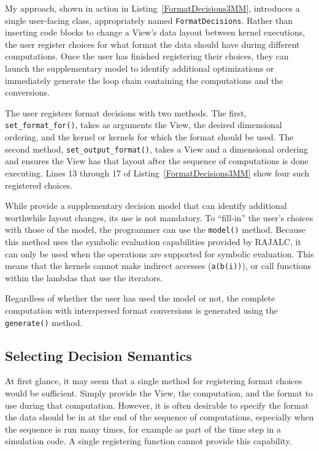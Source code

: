 My approach, shown in action in Listing~\ref{FormatDecisions3MM}, introduces a single user-facing class, appropriately named \verb.FormatDecisions..
Rather than inserting code blocks to change a View's data layout between kernel executions, the user register choices for what format the data should have during different computations. 
Once the user has finished registering their choices, they can launch the supplementary model to identify additional optimizations or immediately generate the loop chain containing the computations and the conversions.

The user registers format decisions with two methods.
The first, \verb.set_format_for()., takes as arguments the View, the desired dimensional ordering, and the kernel or kernels for which the format should be used.
The second method, \verb.set_output_format()., takes a View and a dimensional ordering and ensures the View has that layout after the sequence of computations is done executing.
Lines 13 through 17 of Listing~\ref{FormatDecisions3MM} show four such registered choices.

While \FormatDecisions{} provide a supplementary decision model that can identify additional worthwhile layout changes, its use is not mandatory.
To ``fill-in'' the user's choices with those of the model, the programmer can use the \verb.model(). method.
Because this method uses the symbolic evaluation capabilities provided by RAJALC, it can only be used when the operations are supported for symbolic evaluation.
This means that the kernels cannot make indirect accesses (\verb.a(b(i)).), or call functions within the lambdas that use the iterators.

Regardless of whether the user has used the model or not, 
the complete computation with interspersed format conversions is generated using the \verb.generate(). method.

\subsection{Selecting Decision Semantics}

At first glance, it may seem that a single method for registering format choices would be sufficient. 
Simply provide the View, the computation, and the format to use during that computation.
However, it is often desirable to specify the format the data should be in at the end of the sequence of computations, especially when the sequence is run many times, for example as part of the time step in a simulation code.
A single registering function cannot provide this capability. 

